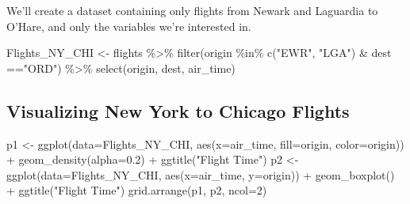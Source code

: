 \documentclass[
  letterpaper,
  DIV=11,
  numbers=noendperiod]{scrreprt}
\newenvironment{Shaded}{\begin{snugshade}}{\end{snugshade}}
\newcommand{\AttributeTok}[1]{\textcolor[rgb]{0.40,0.45,0.13}{#1}}
\newcommand{\DecValTok}[1]{\textcolor[rgb]{0.68,0.00,0.00}{#1}}
\newcommand{\FloatTok}[1]{\textcolor[rgb]{0.68,0.00,0.00}{#1}}
\newcommand{\FunctionTok}[1]{\textcolor[rgb]{0.28,0.35,0.67}{#1}}
\newcommand{\NormalTok}[1]{\textcolor[rgb]{0.00,0.23,0.31}{#1}}
\newcommand{\OtherTok}[1]{\textcolor[rgb]{0.00,0.23,0.31}{#1}}
\newcommand{\SpecialCharTok}[1]{\textcolor[rgb]{0.37,0.37,0.37}{#1}}
\newcommand{\StringTok}[1]{\textcolor[rgb]{0.13,0.47,0.30}{#1}}
\begin{document}
\begin{Shaded}
\end{Shaded}

We'll create a dataset containing only flights from Newark and Laguardia
to O'Hare, and only the variables we're interested in.

\begin{Shaded}
\begin{Highlighting}[]
\NormalTok{Flights\_NY\_CHI }\OtherTok{\textless{}{-}}\NormalTok{ flights }\SpecialCharTok{\%\textgreater{}\%} 
  \FunctionTok{filter}\NormalTok{(origin }\SpecialCharTok{\%in\%} \FunctionTok{c}\NormalTok{(}\StringTok{"EWR"}\NormalTok{, }\StringTok{"LGA"}\NormalTok{) }\SpecialCharTok{\&}\NormalTok{ dest }\SpecialCharTok{==}\StringTok{"ORD"}\NormalTok{) }\SpecialCharTok{\%\textgreater{}\%}
  \FunctionTok{select}\NormalTok{(origin, dest, air\_time)}
\end{Highlighting}
\end{Shaded}

\subsection{Visualizing New York to Chicago
Flights}\label{visualizing-new-york-to-chicago-flights}

\begin{Shaded}
\begin{Highlighting}[]
\NormalTok{p1 }\OtherTok{\textless{}{-}} \FunctionTok{ggplot}\NormalTok{(}\AttributeTok{data=}\NormalTok{Flights\_NY\_CHI, }\FunctionTok{aes}\NormalTok{(}\AttributeTok{x=}\NormalTok{air\_time, }\AttributeTok{fill=}\NormalTok{origin, }\AttributeTok{color=}\NormalTok{origin)) }\SpecialCharTok{+} \FunctionTok{geom\_density}\NormalTok{(}\AttributeTok{alpha=}\FloatTok{0.2}\NormalTok{) }\SpecialCharTok{+} \FunctionTok{ggtitle}\NormalTok{(}\StringTok{"Flight Time"}\NormalTok{)}
\NormalTok{p2 }\OtherTok{\textless{}{-}} \FunctionTok{ggplot}\NormalTok{(}\AttributeTok{data=}\NormalTok{Flights\_NY\_CHI, }\FunctionTok{aes}\NormalTok{(}\AttributeTok{x=}\NormalTok{air\_time, }\AttributeTok{y=}\NormalTok{origin)) }\SpecialCharTok{+} \FunctionTok{geom\_boxplot}\NormalTok{() }\SpecialCharTok{+} \FunctionTok{ggtitle}\NormalTok{(}\StringTok{"Flight Time"}\NormalTok{)}
\FunctionTok{grid.arrange}\NormalTok{(p1, p2, }\AttributeTok{ncol=}\DecValTok{2}\NormalTok{)}
\end{Highlighting}
\end{Shaded}
\end{document}

